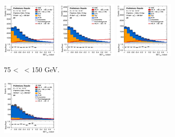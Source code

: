 \begin{figure}[h!]
    \centering
    \begin{subfigure}[b]{\textwidth}
        \centering
        \includegraphics[width=0.32\textwidth]{Images/VH/Own_fit/postfit_VHbb/Region_distmva_BMax150_BMin75_DSR_J2_TTypebb_T2_L2_Y6051_GlobalFit_conditionnal_mu1.png}
        \includegraphics[width=0.32\textwidth]{Images/VH/Own_fit/postfit_VHbb/Region_distmva_BMax150_BMin75_DSR_J3_TTypebb_T2_L2_Y6051_GlobalFit_conditionnal_mu1.png}
        \includegraphics[width=0.32\textwidth]{Images/VH/Own_fit/postfit_VHbb/Region_distmva_BMax150_BMin75_DSR_J4_TTypebb_incJet1_T2_L2_Y6051_GlobalFit_conditionnal_mu1.png}
        \caption{75 < \ptv\ < 150 GeV.}
        \label{fig:plots_VHbb_2L_75_SR}
    \end{subfigure}
    \begin{subfigure}[b]{\textwidth}
        \centering
        \includegraphics[width=0.32\textwidth]{Images/VH/Own_fit/postfit_VHbb/Region_distmva_BMax250_BMin150_DSR_J2_TTypebb_T2_L2_Y6051_GlobalFit_conditionnal_mu1.png}

\end{subfigure}
\end{figure}
